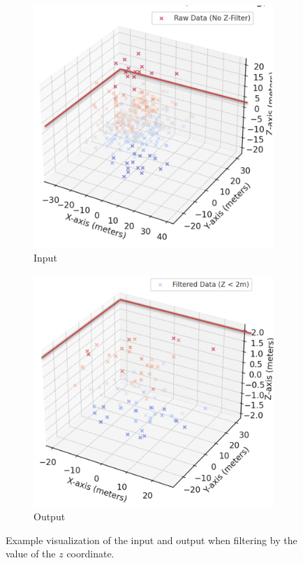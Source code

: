 \begin{figure}[!htbp]
\centering
\begin{subfigure}{0.24\textwidth}
  \centering
  \includegraphics[width=\textwidth]{images/No_filter.png}
  \caption{Input}
\end{subfigure}
\begin{subfigure}{0.24\textwidth}
  \centering
  \includegraphics[width=\textwidth]{images/filter.png}
  \caption{Output}
\end{subfigure}
\caption{Example visualization of the input and output when filtering by the value of the $z$ coordinate.}
\label{fig:static_filter_z_example}
\end{figure}
\FloatBarrier\noindent

